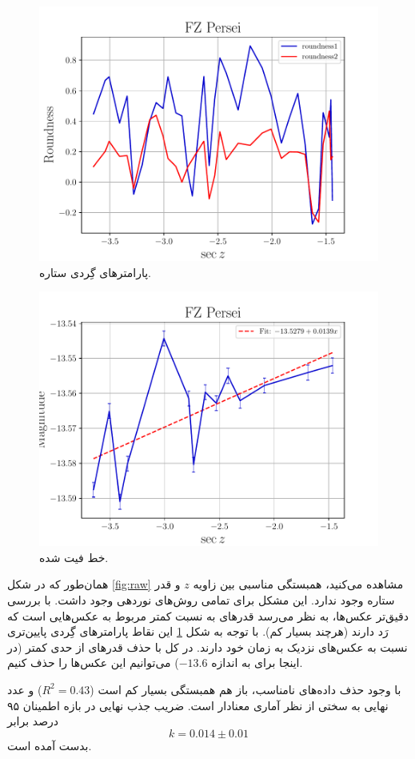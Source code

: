 \documentclass[12pt,a4paper]{article}
\begin{document}
	\begin{figure}
		\centering
		\includegraphics[width=\linewidth]{../fig/roundness}
		\caption{پارامترهای گِردی ستاره.}
		\label{fig:round}
	\end{figure}
	\begin{figure}
		\centering
		\includegraphics[width=\linewidth]{../fig/fit}
		\caption{خط فیت شده.}
	\end{figure}
	همان‌طور که در شکل \ref{fig:raw} مشاهده می‌کنید، همبستگی مناسبی بین زاویه $z$ و قدر ستاره وجود ندارد. این مشکل
	برای تمامی روش‌های نوردهی وجود داشت. با بررسی دقیق‌تر عکس‌ها، به نظر می‌رسد قدر‌های به نسبت کمتر مربوط به عکس‌هایی
	است که رَد دارند (هرچند بسیار کم). با توجه به شکل \ref{fig:round} این نقاط پارامترهای گِردی پایین‌تری نسبت به عکس‌های
	نزدیک به زمان خود دارند. در کل با حذف قدرهای از حدی کمتر (در اینجا برای  به اندازه $-13.6$) می‌توانیم
	این عکس‌ها را حذف کنیم.
	
	با وجود حذف داده‌های نامناسب، باز هم همبستگی بسیار کم است ($R^2 = 0.43 $) و عدد نهایی به سختی از نظر آماری معنادار
	است. ضریب جذب نهایی در بازه اطمینان ۹۵ درصد برابر
	\begin{equation}
		k = 0.014 \pm 0.01
	\end{equation}
	بدست آمده است.
\end{document}
